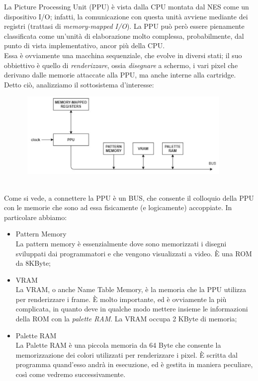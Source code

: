 \documentclass[11pt]{article}
\begin{document}
La Picture Processing Unit (PPU) è vista dalla CPU montata dal NES come un dispositivo I/O; infatti, la comunicazione con questa unità avviene mediante dei registri (trattasi di \emph{memory-mapped I/O}). La PPU può però essere pienamente classificata come un'unità di elaborazione molto complessa, probabilmente, dal punto di vista implementativo, ancor più della CPU.\\
Essa è ovviamente una macchina sequenziale, che evolve in diversi stati; il suo obbiettivo è quello di \emph{renderizzare}, ossia \emph{disegnare} a schermo, i vari pixel che derivano dalle memorie attaccate alla PPU, ma anche interne alla cartridge. Detto ciò, analizziamo il sottosistema d'interesse:
\begin{figure}[h]
\centering
\includegraphics[width=400px, height=156px]{PPUARCH.jpg}
\end{figure}\\
Come si vede, a connettere la PPU è un BUS, che consente il colloquio della PPU con le memorie che sono ad essa fisicamente (e logicamente) accoppiate. In particolare abbiamo:
\begin{itemize}
	\item{
		Pattern Memory\\
		La pattern memory è essenzialmente dove sono memorizzati i disegni sviluppati dai programmatori e che vengono visualizzati a video. È una ROM da 8KByte;
	}
	\item{
		VRAM\\
		La VRAM, o anche Name Table Memory, è la memoria che la PPU utilizza per renderizzare i frame. È molto importante, ed è ovviamente la più complicata, in quanto deve in
		qualche modo mettere insieme le informazioni della ROM con la \emph{palette RAM}. La VRAM occupa 2 KByte di memoria;
	}
	\item{
		Palette RAM\\
		La Palette RAM è una piccola memoria da 64 Byte che consente la memorizzazione dei colori utilizzati per renderizzare i pixel. È scritta dal programma quand'esso andrà
		in esecuzione, ed è gestita in maniera peculiare, così come vedremo successivamente.
	}
\end{itemize}
\end{document}
